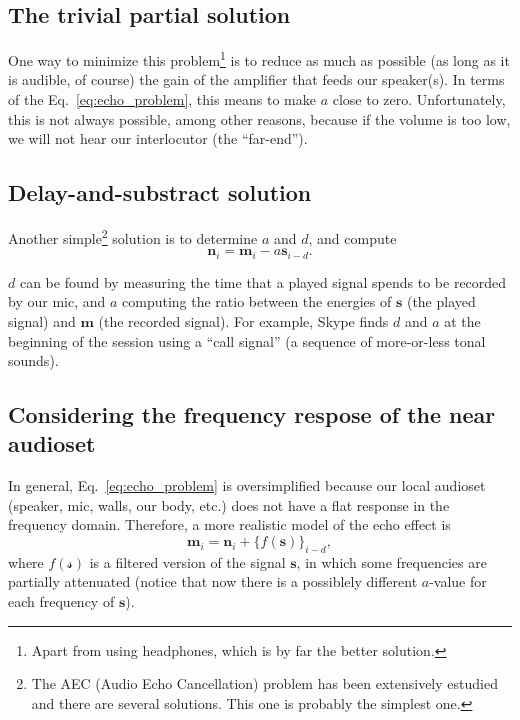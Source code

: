 \subsection{The trivial partial solution}
One way to minimize this problem\footnote{Apart from using headphones,
  which is by far the better solution.} is to reduce as much as
possible (as long as it is audible, of course) the gain of the
amplifier that feeds our speaker(s). In terms of the
Eq.~\eqref{eq:echo_problem}, this means to make $a$ close to
zero. Unfortunately, this is not always possible, among other reasons,
because if the volume is too low, we will not hear our interlocutor
(the ``far-end'').

\subsection{Delay-and-substract solution}
Another simple\footnote{The AEC (Audio Echo Cancellation) problem has
  been extensively estudied and there are several solutions. This one
  is probably the simplest one.} solution is to determine $a$ and $d$,
and compute
\begin{equation}
  {\mathbf n}_i = {\mathbf m}_i - a{\mathbf s}_{i-d}.
  \label{eq:echo_cancellation}
\end{equation}

$d$ can be found by measuring the time that a played signal spends to
be recorded by our mic, and $a$ computing the ratio between the
energies of ${\mathbf s}$ (the played signal) and ${\mathbf m}$ (the
recorded signal). For example, Skype finds $d$ and $a$ at the
beginning of the session using a ``call signal'' (a sequence of
more-or-less tonal sounds).

\subsection{Considering the frequency respose of the near audioset}
In general, Eq.~\eqref{eq:echo_problem} is oversimplified because our
local audioset (speaker, mic, walls, our body, etc.) does not have a
flat response in the frequency domain. Therefore, a more realistic
model of the echo effect is
\begin{equation}
   {\mathbf m}_i = {\mathbf n}_i + \{f({\mathbf s})\}_{i-d},
  \label{eq:more_realistic_echo_problem}
\end{equation}
where $f({\mathcal s})$ is a filtered version of the signal
${\mathbf s}$, in which some frequencies are partially attenuated
(notice that now there is a possiblely different $a$-value for each
frequency of ${\mathbf s}$).

